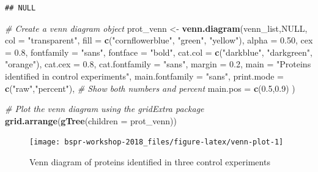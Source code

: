 \documentclass[12pt,]{book}
\newenvironment{Shaded}{\begin{snugshade}}{\end{snugshade}}
\newcommand{\CommentTok}[1]{\textcolor[rgb]{0.56,0.35,0.01}{\textit{#1}}}
\newcommand{\DataTypeTok}[1]{\textcolor[rgb]{0.13,0.29,0.53}{#1}}
\newcommand{\FloatTok}[1]{\textcolor[rgb]{0.00,0.00,0.81}{#1}}
\newcommand{\KeywordTok}[1]{\textcolor[rgb]{0.13,0.29,0.53}{\textbf{#1}}}
\newcommand{\NormalTok}[1]{#1}
\newcommand{\OtherTok}[1]{\textcolor[rgb]{0.56,0.35,0.01}{#1}}
\newcommand{\StringTok}[1]{\textcolor[rgb]{0.31,0.60,0.02}{#1}}
\begin{document}
\begin{verbatim}
## NULL
\end{verbatim}

\begin{Shaded}
\begin{Highlighting}[]
\CommentTok{# Create a venn diagram object}
\NormalTok{prot_venn <-}\StringTok{ }\KeywordTok{venn.diagram}\NormalTok{(venn_list,}\OtherTok{NULL}\NormalTok{, }
               \DataTypeTok{col =} \StringTok{"transparent"}\NormalTok{,}
               \DataTypeTok{fill =} \KeywordTok{c}\NormalTok{(}\StringTok{"cornflowerblue"}\NormalTok{, }\StringTok{"green"}\NormalTok{, }\StringTok{"yellow"}\NormalTok{),}
               \DataTypeTok{alpha =} \FloatTok{0.50}\NormalTok{,}
               \DataTypeTok{cex =} \FloatTok{0.8}\NormalTok{,}
               \DataTypeTok{fontfamily =} \StringTok{"sans"}\NormalTok{,}
               \DataTypeTok{fontface =} \StringTok{"bold"}\NormalTok{,}
               \DataTypeTok{cat.col =} \KeywordTok{c}\NormalTok{(}\StringTok{"darkblue"}\NormalTok{, }\StringTok{"darkgreen"}\NormalTok{, }\StringTok{"orange"}\NormalTok{),}
               \DataTypeTok{cat.cex =} \FloatTok{0.8}\NormalTok{,}
               \DataTypeTok{cat.fontfamily =} \StringTok{"sans"}\NormalTok{,}
               \DataTypeTok{margin =} \FloatTok{0.2}\NormalTok{,}
               \DataTypeTok{main =} \StringTok{"Proteins identified in control experiments"}\NormalTok{,}
               \DataTypeTok{main.fontfamily =} \StringTok{"sans"}\NormalTok{,}
               \DataTypeTok{print.mode =} \KeywordTok{c}\NormalTok{(}\StringTok{"raw"}\NormalTok{,}\StringTok{"percent"}\NormalTok{), }\CommentTok{# Show both numbers and percent}
               \DataTypeTok{main.pos =} \KeywordTok{c}\NormalTok{(}\FloatTok{0.5}\NormalTok{,}\FloatTok{0.9}\NormalTok{)}
\NormalTok{  )}

\CommentTok{# Plot the venn diagram using the gridExtra package}
\KeywordTok{grid.arrange}\NormalTok{(}\KeywordTok{gTree}\NormalTok{(}\DataTypeTok{children =}\NormalTok{ prot_venn))}
\end{Highlighting}
\end{Shaded}

\begin{figure}

{\centering \texttt{[image: bspr-workshop-2018\_files/figure-latex/venn-plot-1]} 

}

\caption{Venn diagram of proteins identified in three control experiments}\label{fig:venn-plot}
\end{figure}
\end{document}
